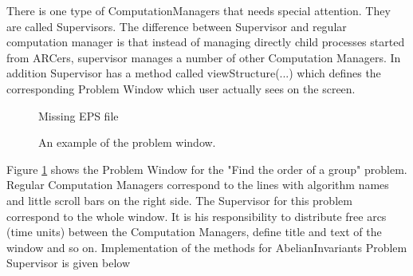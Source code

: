 \documentclass[12pt]{article}
\begin{document}
  There is one type of ComputationManagers that needs special attention. 
  They are called Supervisors. The difference between Supervisor and regular 
  computation
   manager is that instead of managing directly child processes started from 
  ARCers, 
  supervisor manages a number of other Computation Managers. In addition 
  Supervisor has
   a method called viewStructure(...) which defines the corresponding Problem 
  Window which
  user actually sees on the screen.

  \begin{figure}[h]
    \centerline{ Missing EPS file }
  \caption{An example of the problem window.}
  \label{OPWin}
  \end{figure}                             

   Figure \ref{OPWin} shows the Problem  Window for the "Find the order of a 
  group" 
  problem. Regular Computation Managers correspond to the lines with algorithm 
  names and
   little scroll bars on the right side. The Supervisor for this problem 
  correspond to
   the whole window. It is his responsibility to distribute free arcs (time units)
   between the  Computation Managers, define title and text of the window and so 
  on. 
  Implementation of the methods for AbelianInvariants Problem Supervisor is given 
  below
\end{document}
